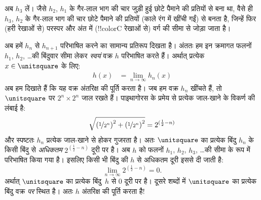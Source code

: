 \documentclass[../../../include/open-logic-section]{subfiles}
\begin{document}
अब $h_3$ लें। जैसे $h_2$, $h_1$ के गैर-लाल भाग की चार जुड़ी हुई छोटे पैमाने
की प्रतियों से बना था, वैसे ही $h_3$, $h_2$ के गैर-लाल भाग की चार छोटे
पैमाने की प्रतियों (काले रंग में खींची गईं) से बनता है, जिन्हें फिर
(हरी रेखाओं से) परस्पर और अंत में (!!{colorC} रेखाओं से) वर्ग की
सीमा से जोड़ा जाता है।
\begin{center}
\end{center}
अब हमें $h_n$ से $h_{n+1}$ परिभाषित करने का सामान्य प्रतिरूप दिखता है। अंततः
हम इन क्रमागत फलनों $h_1$, $h_2$, \dots\@ की बिंदुवार सीमा लेकर \emph{स्वयं}
वक्र $h$ परिभाषित करते हैं। अर्थात् प्रत्येक $x \in \unitsquare$ के लिए:
\begin{align*}
	h(x) &= \lim_{n \rightarrow \infty} h_n(x)
\end{align*} 
अब हम दिखाते हैं कि यह वक्र अंतरिक्ष की पूर्ति करता है। जब हम वक्र $h_n$
खींचते हैं, तो $\unitsquare$ पर $2^n \times 2^n$ जाल रखते हैं। पाइथागोरस के
प्रमेय से प्रत्येक जाल-खाने के विकर्ण की लंबाई है:
\[
\sqrt{\left(\nicefrac{1}{2^{n}}\right)^2+\left(\nicefrac{1}{2^{n}}\right)^2} = 2^{(\frac{1}{2}-n)}
\]
और स्पष्टतः $h_n$ प्रत्येक जाल-खाने से होकर गुजरता है। अतः $\unitsquare$ का
प्रत्येक बिंदु $h_n$ के किसी बिंदु से \emph{अधिकतम}
$2^{(\frac{1}{2}-n)}$ दूरी पर है। अब $h$ को फलनों $h_1$, $h_2$, $h_3$,
\dots\@ की सीमा के रूप में परिभाषित किया गया है। इसलिए किसी भी बिंदु की $h$
से अधिकतम दूरी इससे दी जाती है:
\[
\lim_{n \rightarrow \infty} 2^{(\frac{1}{2}-n)} = 0.
\]
अर्थात् $\unitsquare$ का प्रत्येक बिंदु~$h$ से $0$ दूरी पर है। दूसरे शब्दों
में $\unitsquare$ का प्रत्येक बिंदु वक्र \emph{पर} स्थित है। अतः $h$
अंतरिक्ष की पूर्ति करता है!{}
\end{document}

